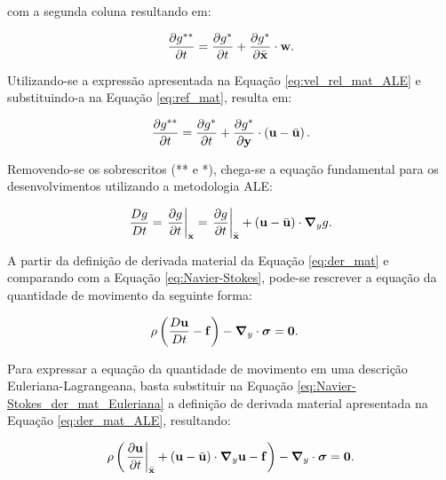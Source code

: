 \noindent com a segunda coluna resultando em:

\begin{align}
	\frac{\partial g^{**}}{\partial t} = \frac{\partial g^*}{\partial t} + \frac{\partial g^*}{\partial \bar{\mathbf{x}}} \cdot \mathbf{w}. \label{eq:ref_mat}
\end{align}

Utilizando-se a expressão apresentada na Equação \eqref{eq:vel_rel_mat_ALE} e substituindo-a na Equação \eqref{eq:ref_mat}, resulta em:

\begin{align}
	\frac{\partial g^{**}}{\partial t} = \frac{\partial g^*}{\partial t} + \frac{\partial g^*}{\partial \mathbf{y}} \cdot \left(\mathbf{u} - \bar{\mathbf{u}} \right). 
\end{align}

Removendo-se os sobrescritos (** e *), chega-se a equação fundamental para os desenvolvimentos utilizando a metodologia ALE:

\begin{align}
	\frac{Dg}{Dt} = \left . \frac{\partial g}{\partial t} \right|_{\mathbf{x}} = \left . \frac{\partial g}{\partial t} \right|_{\bar{\mathbf{x}}} + \left(\mathbf{u} - \bar{\mathbf{u}} \right) \cdot \boldsymbol{\nabla}_y g. \label{eq:der_mat_ALE}
\end{align}

A partir da definição de derivada material da Equação \eqref{eq:der_mat} e comparando com a Equação \eqref{eq:Navier-Stokes}, pode-se rescrever a equação da quantidade de movimento da seguinte forma:

\begin{align}
	\rho\left(\frac{D\mathbf{u}}{Dt} - \mathbf{f} \right) - \boldsymbol{\nabla}_y \cdot \boldsymbol{\sigma} &= \mathbf{0}. \label{eq:Navier-Stokes_der_mat_Euleriana}
\end{align}

Para expressar a equação da quantidade de movimento em uma descrição Euleriana-Lagrangeana, basta substituir na Equação \eqref{eq:Navier-Stokes_der_mat_Euleriana} a definição de derivada material apresentada na Equação \eqref{eq:der_mat_ALE}, resultando:

\begin{align}
	\rho\left(\left. \frac{\partial\mathbf{u}}{\partial t} \right|_{\bar{\mathbf{x}}} + \left(\mathbf{u} - \bar{\mathbf{u}} \right) \cdot \boldsymbol{\nabla}_y  \mathbf{u}  - \mathbf{f} \right) - \boldsymbol{\nabla}_y \cdot \boldsymbol{\sigma} = \mathbf{0}. \label{eq:Navier-Stokes_ALE} 
\end{align}

